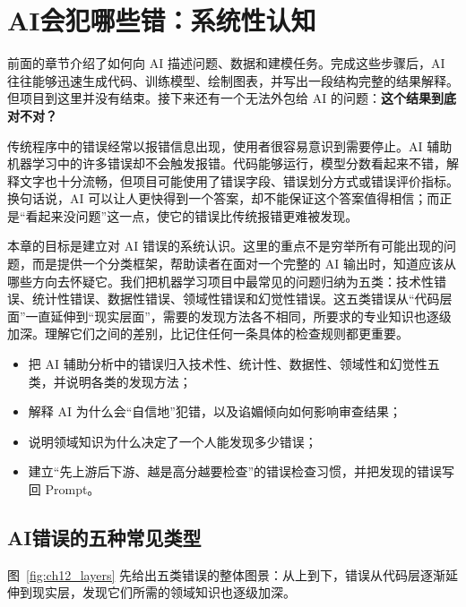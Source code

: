 \chapter{AI会犯哪些错：系统性认知}

前面的章节介绍了如何向 AI 描述问题、数据和建模任务。完成这些步骤后，AI 往往能够迅速生成代码、训练模型、绘制图表，并写出一段结构完整的结果解释。但项目到这里并没有结束。接下来还有一个无法外包给 AI 的问题：\textbf{这个结果到底对不对？}

传统程序中的错误经常以报错信息出现，使用者很容易意识到需要停止。AI 辅助机器学习中的许多错误却不会触发报错。代码能够运行，模型分数看起来不错，解释文字也十分流畅，但项目可能使用了错误字段、错误划分方式或错误评价指标。换句话说，AI 可以让人更快得到一个答案，却不能保证这个答案值得相信；而正是“看起来没问题”这一点，使它的错误比传统报错更难被发现。

本章的目标是建立对 AI 错误的系统认识。这里的重点不是穷举所有可能出现的问题，而是提供一个分类框架，帮助读者在面对一个完整的 AI 输出时，知道应该从哪些方向去怀疑它。我们把机器学习项目中最常见的问题归纳为五类：技术性错误、统计性错误、数据性错误、领域性错误和幻觉性错误。这五类错误从“代码层面”一直延伸到“现实层面”，需要的发现方法各不相同，所要求的专业知识也逐级加深。理解它们之间的差别，比记住任何一条具体的检查规则都更重要。

\begin{chapterguide}
\begin{itemize}
  \item 把 AI 辅助分析中的错误归入技术性、统计性、数据性、领域性和幻觉性五类，并说明各类的发现方法；
  \item 解释 AI 为什么会“自信地”犯错，以及谄媚倾向如何影响审查结果；
  \item 说明领域知识为什么决定了一个人能发现多少错误；
  \item 建立“先上游后下游、越是高分越要检查”的错误检查习惯，并把发现的错误写回 Prompt。
\end{itemize}
\end{chapterguide}

\section{AI错误的五种常见类型}

图~\ref{fig:ch12_layers} 先给出五类错误的整体图景：从上到下，错误从代码层逐渐延伸到现实层，发现它们所需的领域知识也逐级加深。

